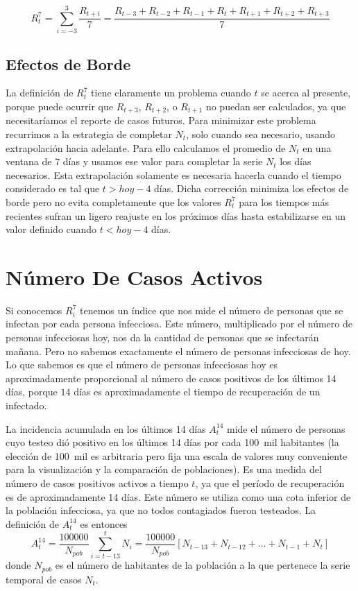 \documentclass[12pt,a4paper]{article}
\begin{document}
\begin{equation}
R^7_t = \sum_{i=-3}^{3} \frac{R_{t+i}}{7} = 
\frac{R_{t-3}+R_{t-2}+R_{t-1}+R_t+R_{t+1}+R_{t+2}+R_{t+3}}{7}
\end{equation}

\subsection*{Efectos de Borde}
La definición de $R^7_t$ tiene claramente 
un problema cuando $t$ se acerca al presente, porque 
puede ocurrir que $R_{t+3}$, $R_{t+2}$, o $R_{t+1}$ no puedan 
ser calculados, ya que necesitaríamos el reporte de casos 
futuros. Para minimizar este problema recurrimos a la estrategia 
de completar $N_t$, solo cuando sea necesario, 
usando extrapolación hacia adelante. Para ello 
calculamos el promedio de $N_t$ en una ventana de 7 días 
y usamos ese valor para completar la serie $N_t$ los 
días necesarios. 
Esta extrapolación solamente es necesaria hacerla 
cuando el tiempo considerado es tal que $t>hoy-4$ días. Dicha corrección minimiza los efectos de borde 
pero no evita completamente que los valores 
$R^7_t$ para los tiempos más recientes 
sufran un ligero reajuste en los próximos días 
hasta estabilizarse en un valor definido 
cuando $t<hoy-4$ días.  

\section*{Número De Casos Activos}

Si conocemos $R^7_i$ tenemos un índice que nos mide el número de personas 
que se infectan por cada persona infecciosa. Este número,
multiplicado por el número de personas infecciosas hoy, nos da la 
cantidad de personas que se infectarán mañana.
Pero no sabemos exactamente el número de personas infecciosas de hoy. 
Lo que sabemos es que el número de personas infecciosas hoy es aproximadamente 
proporcional al número de casos positivos de los últimos 14 días, 
porque $14$ días es aproximadamente el tiempo de recuperación de un infectado.

La incidencia acumulada en los últimos 14 días $A^{14}_t$ mide el número de personas cuyo testeo dió positivo en los últimos 14 días por cada 100~mil habitantes (la elección de 100~mil es arbitraria pero fija una escala de valores muy conveniente para la visualización y la comparación de poblaciones). Es una medida del número de casos positivos activos a tiempo 
$t$, ya que el período de recuperación es de aproximadamente 14 días. 
Este número se utiliza como una cota inferior de la población infecciosa, 
ya que no todos contagiados fueron testeados. 
La definición de $A^{14}_t$ es entonces  
\begin{equation}
A^{14}_t = \frac{100000}{N_{pob}}\sum_{i=t-13}^t N_i = \frac{100000}{N_{pob}}[N_{t-13}+N_{t-12}+...+N_{t-1}+N_{t}]
\end{equation}
donde $N_{pob}$ es el número de habitantes de la población 
a la que pertenece la serie temporal de casos $N_t$.
\end{document}
